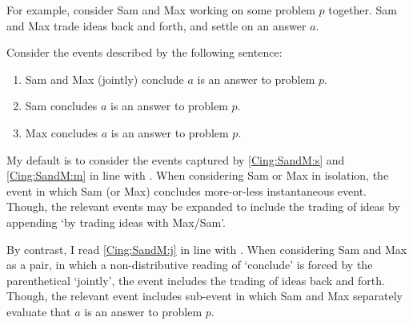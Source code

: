 \begin{note}
{  For example, consider Sam and Max working on some problem \(p\) together.
  Sam and Max trade ideas back and forth, and settle on an answer \(a\).

  Consider the events described by the following sentence:
  \begin{enumerate}[label=\arabic*., ref=(\arabic*), noitemsep]
  \item
    \label{Cing:SandM:j}
    Sam and Max (jointly) conclude \(a\) is an answer to problem \(p\).
  \item
    \label{Cing:SandM:s}
    Sam concludes \(a\) is an answer to problem \(p\).
  \item
    \label{Cing:SandM:m}
    Max concludes \(a\) is an answer to problem \(p\).
  \end{enumerate}

  My default is to consider the events captured by \ref{Cing:SandM:s} and \ref{Cing:SandM:m} in line with \citeauthor{Gardner:1986wp}.
  When considering Sam or Max in isolation, the event in which Sam (or Max) concludes more-or-less instantaneous event.
  Though, the relevant events may be expanded to include the trading of ideas by appending `by trading ideas with Max/Sam'.

  By contrast, I read \ref{Cing:SandM:j} in line with \citeauthor{Bratman:1979aa}.
  When considering Sam and Max as a pair, in which a non-distributive reading of `conclude' is forced by the parenthetical `jointly', the event includes the trading of ideas back and forth.
  Though, the relevant event includes sub-event in which Sam and Max separately evaluate that \(a\) is an answer to problem \(p\).
  }
\end{note}

\newpage

